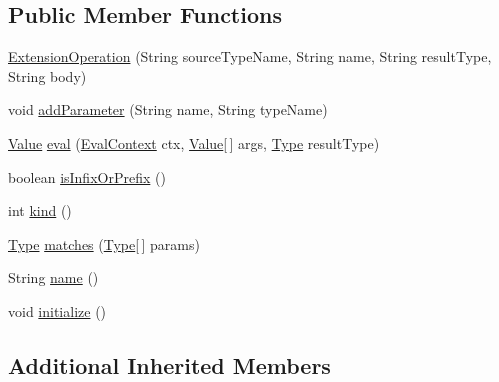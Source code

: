 \subsection*{Public Member Functions}
\begin{DoxyCompactItemize}
\item 
\hyperlink{classorg_1_1tzi_1_1use_1_1uml_1_1ocl_1_1extension_1_1_extension_operation_aaa5573b727b9eb5cb2fd2df3c0352b4a}{Extension\-Operation} (String source\-Type\-Name, String name, String result\-Type, String body)
\item 
void \hyperlink{classorg_1_1tzi_1_1use_1_1uml_1_1ocl_1_1extension_1_1_extension_operation_ac01abe9c96e655f0d9f3ed2f3e52ed3a}{add\-Parameter} (String name, String type\-Name)
\item 
\hyperlink{classorg_1_1tzi_1_1use_1_1uml_1_1ocl_1_1value_1_1_value}{Value} \hyperlink{classorg_1_1tzi_1_1use_1_1uml_1_1ocl_1_1extension_1_1_extension_operation_acd409148559fd3b2e6526f9172b49676}{eval} (\hyperlink{classorg_1_1tzi_1_1use_1_1uml_1_1ocl_1_1expr_1_1_eval_context}{Eval\-Context} ctx, \hyperlink{classorg_1_1tzi_1_1use_1_1uml_1_1ocl_1_1value_1_1_value}{Value}\mbox{[}$\,$\mbox{]} args, \hyperlink{interfaceorg_1_1tzi_1_1use_1_1uml_1_1ocl_1_1type_1_1_type}{Type} result\-Type)
\item 
boolean \hyperlink{classorg_1_1tzi_1_1use_1_1uml_1_1ocl_1_1extension_1_1_extension_operation_abbc49a6a7db865659afe9c63a04a1eda}{is\-Infix\-Or\-Prefix} ()
\item 
int \hyperlink{classorg_1_1tzi_1_1use_1_1uml_1_1ocl_1_1extension_1_1_extension_operation_ab65c79cf959924712f5086fc84d8e711}{kind} ()
\item 
\hyperlink{interfaceorg_1_1tzi_1_1use_1_1uml_1_1ocl_1_1type_1_1_type}{Type} \hyperlink{classorg_1_1tzi_1_1use_1_1uml_1_1ocl_1_1extension_1_1_extension_operation_a8f3632ccc795a79b8c5ce5c3d560bbc8}{matches} (\hyperlink{interfaceorg_1_1tzi_1_1use_1_1uml_1_1ocl_1_1type_1_1_type}{Type}\mbox{[}$\,$\mbox{]} params)
\item 
String \hyperlink{classorg_1_1tzi_1_1use_1_1uml_1_1ocl_1_1extension_1_1_extension_operation_a39a47aba7d3bbfd3f1108a1a094a5447}{name} ()
\item 
void \hyperlink{classorg_1_1tzi_1_1use_1_1uml_1_1ocl_1_1extension_1_1_extension_operation_ac07a74c44f9e20ab69f781199ee42055}{initialize} ()
\end{DoxyCompactItemize}
\subsection*{Additional Inherited Members}



